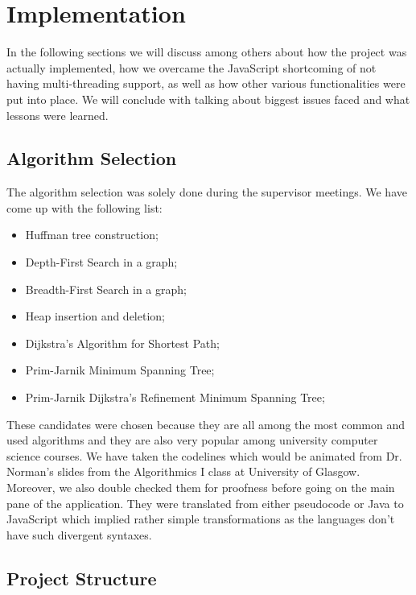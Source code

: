 \documentclass{l4proj}
\begin{document}
\chapter{Implementation}
\label{implementation}

In the following sections we will discuss among others about how the project was actually implemented, how we overcame the
JavaScript shortcoming of not having multi-threading support, as well as how other various functionalities were put
into place. We will conclude with talking about biggest issues faced and what lessons were learned. 

\section{Algorithm Selection}

The algorithm selection was solely done during the supervisor meetings. We have come up with the following list:

\begin{itemize}
    \item Huffman tree construction;
    \item Depth-First Search in a graph;
    \item Breadth-First Search in a graph;
    \item Heap insertion and deletion;
    \item Dijkstra's Algorithm for Shortest Path;
    \item Prim-Jarnik Minimum Spanning Tree;
    \item Prim-Jarnik Dijkstra's Refinement Minimum Spanning Tree;
\end{itemize}

These candidates were chosen because they are all among the most common and used algorithms and they are also very
popular among university computer science courses. We have taken the codelines which would be animated from Dr.
Norman's slides from the Algorithmics I class at University of Glasgow. Moreover, we also double checked them for proofness
before going on the main pane of the application.
They were translated from either pseudocode or Java to JavaScript which implied rather simple transformations as
the languages don't have such divergent syntaxes. 

\section{Project Structure}
\end{document}
